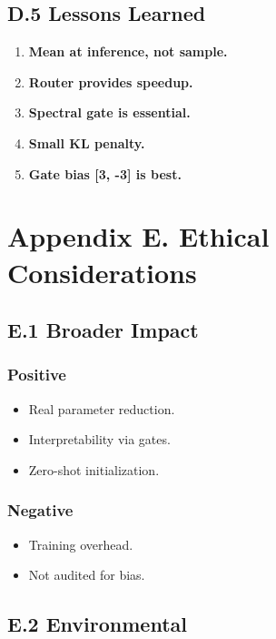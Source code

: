 \subsection{D.5 Lessons Learned}

\begin{enumerate}
\item \textbf{Mean at inference, not sample.}
\item \textbf{Router provides speedup.}
\item \textbf{Spectral gate is essential.}
\item \textbf{Small KL penalty.}
\item \textbf{Gate bias [3, -3] is best.}

\end{enumerate}


\section{Appendix E. Ethical Considerations}

\subsection{E.1 Broader Impact}

\subsubsection{Positive}
\begin{itemize}
\item Real parameter reduction.
\item Interpretability via gates.
\item Zero-shot initialization.

\end{itemize}
\subsubsection{Negative}
\begin{itemize}
\item Training overhead.
\item Not audited for bias.

\end{itemize}
\subsection{E.2 Environmental}

